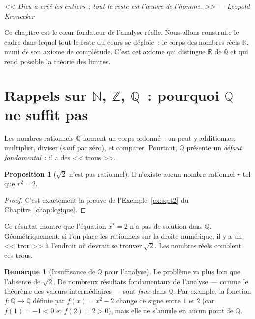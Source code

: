 \documentclass[12pt,a4paper,openany]{book}
\theoremstyle{definition}
\newtheorem{proposition}{Proposition}[chapter]
\newtheorem{remarque}{Remarque}[chapter]
\newcommand{\N}{\mathbb{N}}
\newcommand{\Z}{\mathbb{Z}}
\newcommand{\Q}{\mathbb{Q}}
\newcommand{\R}{\mathbb{R}}
\begin{document}
\vspace{-0.5cm}
\begin{center}\itshape
  << Dieu a créé les entiers~; tout le reste est l'{\oe}uvre de l'homme. >> --- Leopold Kronecker
\end{center}
\bigskip

Ce chapitre est le c{\oe}ur fondateur de l'analyse réelle. Nous allons construire le cadre dans lequel tout le reste du cours se déploie~: le corps des nombres réels $\R$, muni de son axiome de complétude. C'est cet axiome qui distingue $\R$ de $\Q$ et qui rend possible la théorie des limites.

\section{Rappels sur $\N$, $\Z$, $\Q$~: pourquoi $\Q$ ne suffit pas}
\label{sec:rappels-Q}

Les nombres rationnels $\Q$ forment un corps ordonné~: on peut y additionner, multiplier, diviser (sauf par zéro), et comparer. Pourtant, $\Q$ présente un \emph{défaut fondamental}~: il a des << trous >>.

\begin{proposition}[$\sqrt{2}$ n'est pas rationnel]\label{prop:sqrt2-rappel}
  Il n'existe aucun nombre rationnel $r$ tel que $r^2 = 2$.
\end{proposition}

\begin{proof}
  C'est exactement la preuve de l'Exemple~\ref{ex:sqrt2} du Chapitre~\ref{chap:logique}.
\end{proof}

Ce résultat montre que l'équation $x^2 = 2$ n'a pas de solution dans $\Q$. Géométriquement, si l'on place les rationnels sur la droite numérique, il y a un << trou >> à l'endroit où devrait se trouver $\sqrt{2}$. Les nombres réels comblent ces trous.

\begin{remarque}[Insuffisance de $\Q$ pour l'analyse]\label{rem:Q-insuffisant}
  Le problème va plus loin que l'absence de $\sqrt{2}$. De nombreux résultats fondamentaux de l'analyse --- comme le théorème des valeurs intermédiaires --- sont \emph{faux} dans $\Q$. Par exemple, la fonction $f : \Q \to \Q$ définie par $f(x) = x^2 - 2$ change de signe entre $1$ et $2$ (car $f(1) = -1 < 0$ et $f(2) = 2 > 0$), mais elle ne s'annule en aucun point de $\Q$.
\end{remarque}
\end{document}
